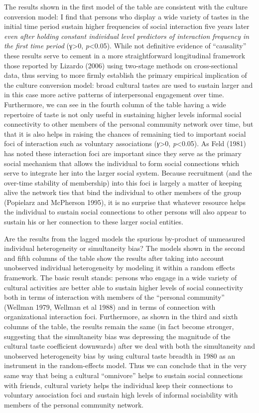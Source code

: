 The results shown in the first model of the table are consistent with the culture conversion model: I find that persons who display a wide variety of tastes in the initial time period sustain higher frequencies of social interaction five years later \emph{even after holding constant individual level predictors of interaction frequency in the first time period} (γ\textgreater0, \emph{p}\textless0.05). While not definitive evidence of ``causality'' these results serve to cement in a more straightforward longitudinal framework those reported by Lizardo (2006) using two-stage methods on cross-sectional data, thus serving to more firmly establish the primary empirical implication of the culture conversion model: broad cultural tastes are used to sustain larger and in this case more active patterns of interpersonal engagement over time. Furthermore, we can see in the fourth column of the table having a wide repertoire of taste is not only useful in sustaining higher levels informal social connectivity to other members of the personal community network over time, but that it is also helps in raising the chances of remaining tied to important social foci of interaction such as voluntary associations (\emph{γ}\textgreater0, \emph{p}\textless0.05). As Feld (1981) has noted these interaction foci are important since they serve as the primary social mechanism that allows the individual to form social connections which serve to integrate her into the larger social system. Because recruitment (and the over-time stability of membership) into this foci is largely a matter of keeping alive the network ties that bind the individual to other members of the group (Popielarz and McPherson 1995), it is no surprise that whatever resource helps the individual to sustain social connections to other persons will also appear to sustain his or her connection to these larger social entities.

Are the results from the lagged models the spurious by-product of unmeasured individual heterogeneity or simultaneity bias? The models shown in the second and fifth columns of the table show the results after taking into account unobserved individual heterogeneity by modeling it within a random effects framework. The basic result stands: persons who engage in a wide variety of cultural activities are better able to sustain higher levels of social connectivity both in terms of interaction with members of the ``personal community'' (Wellman 1979, Wellman et al 1988) and in terms of connection with organizational interaction foci. Furthermore, as shown in the third and sixth columns of the table, the results remain the same (in fact become stronger, suggesting that the simultaneity bias was depressing the magnitude of the cultural taste coefficient downwards) after we deal with both the simultaneity and unobserved heterogeneity bias by using cultural taste breadth in 1980 as an instrument in the random-effects model. Thus we can conclude that in the very same way that being a cultural ``omnivore'' helps to sustain social connections with friends, cultural variety helps the individual keep their connections to voluntary association foci and sustain high levels of informal sociability with members of the personal community network.

